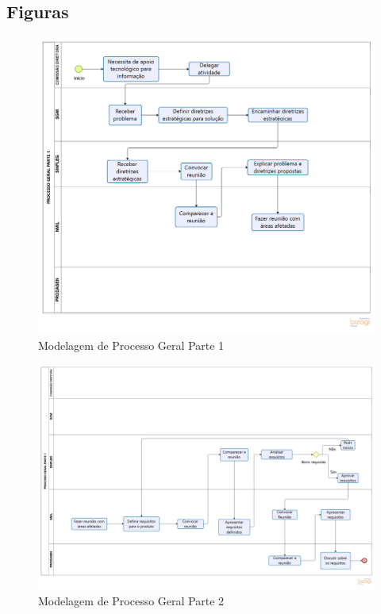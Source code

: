 \begin{apendicesenv}
    \partapendices

    \chapter{Figuras}
    \label{ch:figuras}

    \begin{landscape}
        \begin{figure}[H]
            \centering
            \includegraphics[width=1.0\textwidth]{figuras/modelagemProcessoGeralParte1.png}
            \caption{Modelagem de Processo Geral Parte 1}
            \label{img:modelagemProcessoGeralParte1}
        \end{figure}
    \end{landscape}

    \begin{landscape}
        \begin{figure}[H]
            \centering
            \includegraphics[width=1.3\textwidth]{figuras/modelagemProcessoGeralParte2.png}
            \caption{Modelagem de Processo Geral Parte 2}
            \label{img:modelagemProcessoGeralParte2}
        \end{figure}
    \end{landscape}
    
\end{apendicesenv}